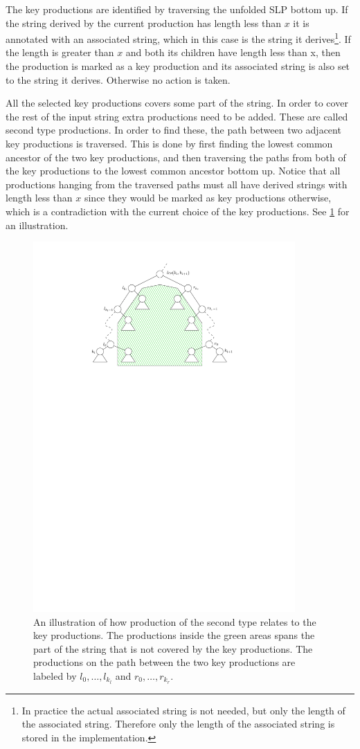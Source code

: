 \documentclass[twoside,11pt,openright]{report}
\begin{document}
The key productions are identified by traversing the unfolded SLP bottom up. If the string derived by the current production has length less than $x$ it is annotated with an associated string, which in this case is the string it derives\footnote{In practice the actual associated string is not needed, but only the length of the associated string. Therefore only the length of the associated string is stored in the implementation.}. If the length is greater than $x$ and both its children have length less than x, then the production is marked as a key production and its associated string is also set to the string it derives. Otherwise no action is taken.

All the selected key productions covers some part of the string. In order to cover the rest of the input string extra productions need to be added. These are called second type productions. In order to find these, the path between two adjacent key productions is traversed. This is done by first finding the lowest common ancestor of the two key productions, and then traversing the paths from both of the key productions to the lowest common ancestor bottom up. Notice that all productions hanging from the traversed paths must all have derived strings with length less than $x$ since they would be marked as key productions otherwise, which is a contradiction with the current choice of the key productions. See \cref{fig:slp-2nd-type} for an illustration.

\begin{figure}[!htb]
  \centering
  \includegraphics[width=10cm]{images/slp-2nd-type}
  \caption{An illustration of how production of the second type relates to the key productions. The productions inside the green areas spans the part of the string that is not covered by the key productions. The productions on the path between the two key productions are labeled by $l_0, \dots, l_{k_l}$ and $r_0, \dots, r_{k_r}$.}
  \label{fig:slp-2nd-type}
\end{figure}
\end{document}
